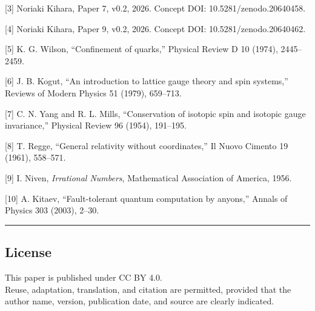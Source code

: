 \documentclass[
]{article}
\begin{document}
{[}3{]} Noriaki Kihara, Paper 7, v0.2, 2026. Concept DOI: 10.5281/zenodo.20640458.

{[}4{]} Noriaki Kihara, Paper 9, v0.2, 2026. Concept DOI: 10.5281/zenodo.20640462.

{[}5{]} K. G. Wilson, ``Confinement of quarks,'' Physical Review D 10
(1974), 2445--2459.

{[}6{]} J. B. Kogut, ``An introduction to lattice gauge theory and spin
systems,'' Reviews of Modern Physics 51 (1979), 659--713.

{[}7{]} C. N. Yang and R. L. Mills, ``Conservation of isotopic spin and
isotopic gauge invariance,'' Physical Review 96 (1954), 191--195.

{[}8{]} T. Regge, ``General relativity without coordinates,'' Il Nuovo
Cimento 19 (1961), 558--571.

{[}9{]} I. Niven, \emph{Irrational Numbers}, Mathematical Association of
America, 1956.

{[}10{]} A. Kitaev, ``Fault-tolerant quantum computation by anyons,''
Annals of Physics 303 (2003), 2--30.

\begin{center}\rule{0.5\linewidth}{0.5pt}\end{center}

\subsection{License}\label{license}

This paper is published under CC BY 4.0.\\
Reuse, adaptation, translation, and citation are permitted, provided
that the author name, version, publication date, and source are clearly
indicated.
\end{document}
